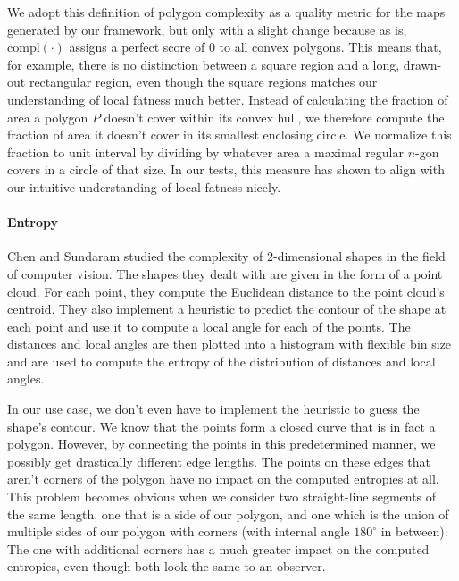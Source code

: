 We adopt this definition of polygon complexity as a quality metric for the maps generated by our framework, but only with a slight change because as is, $\text{compl}(\cdot)$ assigns a perfect score of $0$ to all convex polygons.
This means that, for example, there is no distinction between a square region and a long, drawn-out rectangular region, even though the square regions matches our understanding of local fatness much better.
Instead of calculating the fraction of area a polygon $P$ doesn't cover within its convex hull, we therefore compute the fraction of area it doesn't cover in its smallest enclosing circle.
We normalize this fraction to unit interval by dividing by whatever area a maximal regular $n$-gon covers in a circle of that size.
In our tests, this measure has shown to align with our intuitive understanding of local fatness nicely.



\paragraph{Entropy}

Chen and Sundaram \cite{chen2005estimating} studied the complexity of 2-dimensional shapes in the field of computer vision.
The shapes they dealt with are given in the form of a point cloud.
For each point, they compute the Euclidean distance to the point cloud's centroid.
They also implement a heuristic to predict the contour of the shape at each point and use it to compute a local angle for each of the points.
The distances and local angles are then plotted into a histogram with flexible bin size and are used to compute the entropy of the distribution of distances and local angles.

In our use case, we don't even have to implement the heuristic to guess the shape's contour.
We know that the points form a closed curve that is in fact a polygon.
However, by connecting the points in this predetermined manner, we possibly get drastically different edge lengths.
The points on these edges that aren't corners of the polygon have no impact on the computed entropies at all.
This problem becomes obvious when we consider two straight-line segments of the same length, one that is a side of our polygon, and one which is the union of multiple sides of our polygon with corners (with internal angle $180^\circ$ in between):
The one with additional corners has a much greater impact on the computed entropies, even though both look the same to an observer.

